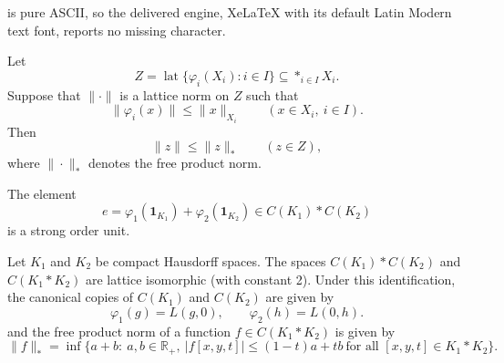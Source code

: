 \documentclass[10pt,a4paper]{amsart}
\DeclareMathOperator{\lat}{lat}
\newcommand{\bigfree}{\mathop{\ast}}
\newcommand{\one}{\mathbf{1}}
\begin{document}
is pure ASCII, so the delivered engine, XeLaTeX with its default Latin Modern text font, reports no missing character.
\begin{proposition}\label{prop:maximal-norm}
Let
\[
Z=\lat\{\varphi_i(X_i):i\in I\}\subseteq \bigfree_{i\in I}X_i.
\]
Suppose that $\|\cdot\|$ is a lattice norm on $Z$ such that
\[
\|\varphi_i(x)\|\leq \|x\|_{X_i}
\qquad (x\in X_i,\ i\in I).
\]
Then
\[
\|z\|\leq \|z\|_{\ast}
\qquad (z\in Z),
\]
where $\|\cdot\|_{\ast}$ denotes the free product norm.
\end{proposition}

\begin{proposition}\label{prop:strong-unit}
The element
\[
e=\varphi_1(\one_{K_1})+\varphi_2(\one_{K_2})\in C(K_1)\ast C(K_2)
\]
is a strong order unit.
\end{proposition}

\begin{theorem}\label{thm:CK-join}
Let $K_1$ and $K_2$ be compact Hausdorff spaces. The spaces $C(K_1)\ast C(K_2)$ and $C(K_1\ast K_2)$ are lattice isomorphic (with constant 2). Under this identification, the canonical copies of $C(K_1)$ and $C(K_2)$ are given by
\[
\varphi_1(g)=L(g,0),
\qquad
\varphi_2(h)=L(0,h).
\]
and the free product norm of a function $f\in C(K_1*K_2)$ is given by
\[
\|f\|_*
=\inf\Big\{a+b:\ a,b\in\mathbb R_+,\ |f[x,y,t]|\leq (1-t)a+tb\ \text{for all } [x,y,t]\in K_1\ast K_2\Big\}.
\]

\end{theorem}
\end{document}
